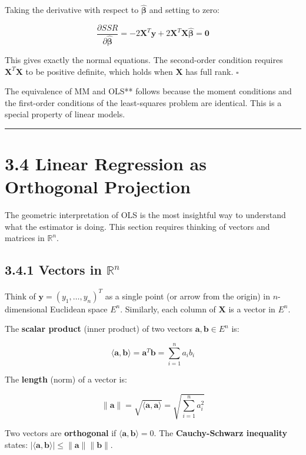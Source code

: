 Taking the derivative with respect to $\hat{\boldsymbol{\beta}}$ and setting to zero:

\[
\frac{\partial SSR}{\partial \hat{\boldsymbol{\beta}}} = -2\mathbf{X}^T\mathbf{y} + 2\mathbf{X}^T\mathbf{X}\hat{\boldsymbol{\beta}} = \mathbf{0}
\]

This gives exactly the normal equations. The second-order condition requires $\mathbf{X}^T\mathbf{X}$ to be positive definite, which holds when $\mathbf{X}$ has full rank. $\square$

\begin{keybox}{The equivalence of MM and OLS** follows because the moment conditions and the first-order conditions of the least-squares problem are identical. This is a special property of linear models.}
\end{keybox}

\medskip\hrule\medskip

\section{3.4 Linear Regression as Orthogonal Projection}

The geometric interpretation of OLS is the most insightful way to understand what the estimator is doing. This section requires thinking of vectors and matrices in $\mathbb{R}^n$.

\subsection{3.4.1 Vectors in $\mathbb{R}^n$}

Think of $\mathbf{y} = (y_1, \ldots, y_n)^T$ as a single point (or arrow from the origin) in $n$-dimensional Euclidean space $E^n$. Similarly, each column of $\mathbf{X}$ is a vector in $E^n$.

The \textbf{scalar product} (inner product) of two vectors $\mathbf{a}, \mathbf{b} \in E^n$ is:

\[
\langle \mathbf{a}, \mathbf{b} \rangle = \mathbf{a}^T \mathbf{b} = \sum_{i=1}^n a_i b_i
\]

The \textbf{length} (norm) of a vector is:

\[
\|\mathbf{a}\| = \sqrt{\langle \mathbf{a}, \mathbf{a} \rangle} = \sqrt{\sum_{i=1}^n a_i^2}
\]

Two vectors are \textbf{orthogonal} if $\langle \mathbf{a}, \mathbf{b} \rangle = 0$. The \textbf{Cauchy-Schwarz inequality} states: $|\langle \mathbf{a}, \mathbf{b} \rangle| \leq \|\mathbf{a}\| \|\mathbf{b}\|$.

